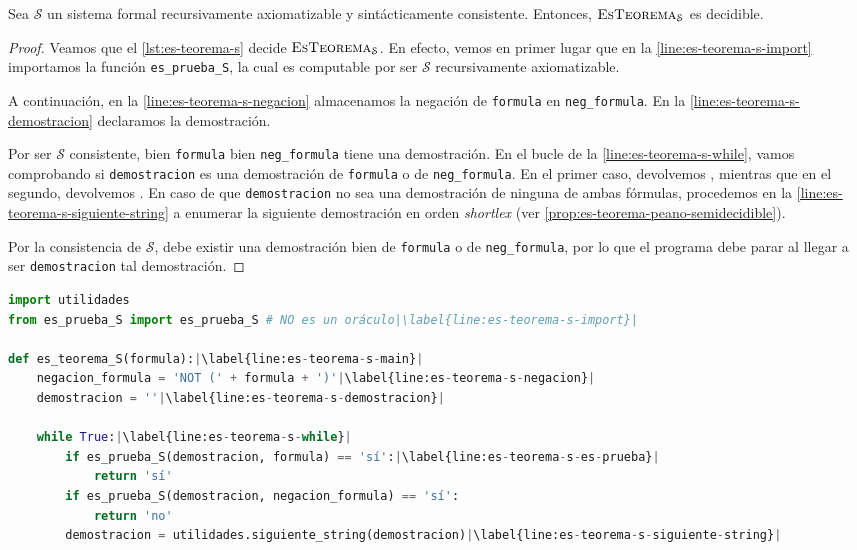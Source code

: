 \begin{proposicion}\label{prop:es-teorema-consistente-decidible}
Sea $\mathcal{S}$ un sistema formal recursivamente axiomatizable y sintácticamente consistente. Entonces, $\textsc{EsTeorema}_\mathcal{S}$ es decidible.
\end{proposicion}
\begin{proof}
Veamos que el \cref{lst:es-teorema-s} decide $\textsc{EsTeorema}_\mathcal{S}$. En efecto, vemos en primer lugar que en la \cref{line:es-teorema-s-import} importamos la función \texttt{es\_prueba\_S}, la cual es computable por ser $\mathcal{S}$ recursivamente axiomatizable.

A continuación, en la \cref{line:es-teorema-s-negacion} almacenamos la negación de \texttt{formula} en \texttt{neg\_formula}. En la \cref{line:es-teorema-s-demostracion} declaramos la demostración.

Por ser $\mathcal{S}$ consistente, bien \texttt{formula} bien \texttt{neg\_formula} tiene una demostración. En el bucle de la \cref{line:es-teorema-s-while}, vamos comprobando si \texttt{demostracion} es una demostración de \texttt{formula} o de \texttt{neg\_formula}. En el primer caso, devolvemos , mientras que en el segundo, devolvemos . En caso de que \texttt{demostracion} no sea una demostración de ninguna de ambas fórmulas, procedemos en la \cref{line:es-teorema-s-siguiente-string} a enumerar la siguiente demostración en orden \emph{shortlex} (ver \cref{prop:es-teorema-peano-semidecidible}).

Por la consistencia de $\mathcal{S}$, debe existir una demostración bien de \texttt{formula} o de \texttt{neg\_formula}, por lo que el programa debe parar al llegar a ser \texttt{demostracion} tal demostración.
\end{proof}

\begin{lstlisting}[language=Python, caption=\lstinline{es_teorema_S.py},label={lst:es-teorema-s}]
import utilidades
from es_prueba_S import es_prueba_S # NO es un oráculo|\label{line:es-teorema-s-import}|

def es_teorema_S(formula):|\label{line:es-teorema-s-main}|
    negacion_formula = 'NOT (' + formula + ')'|\label{line:es-teorema-s-negacion}|
    demostracion = ''|\label{line:es-teorema-s-demostracion}|

    while True:|\label{line:es-teorema-s-while}|
        if es_prueba_S(demostracion, formula) == 'sí':|\label{line:es-teorema-s-es-prueba}|
            return 'sí'
        if es_prueba_S(demostracion, negacion_formula) == 'sí':
            return 'no'
        demostracion = utilidades.siguiente_string(demostracion)|\label{line:es-teorema-s-siguiente-string}|
\end{lstlisting}

